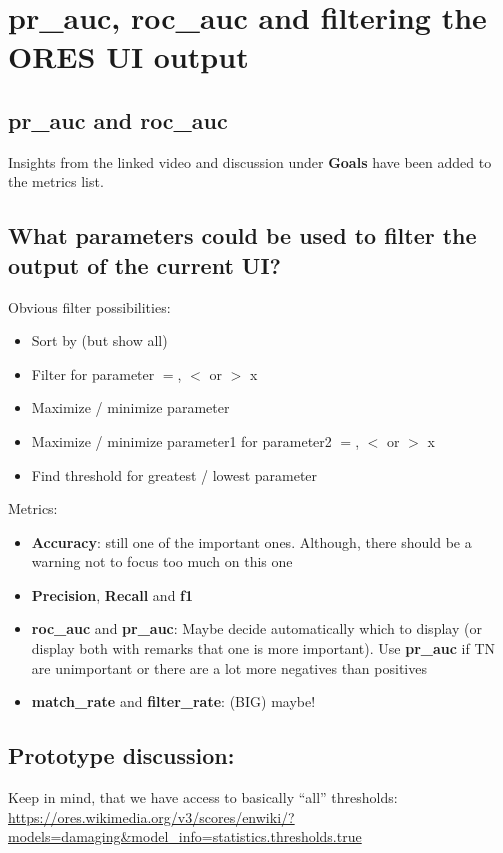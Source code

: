 \documentclass[12pt,a4paper]{article}
\begin{document}
\section{pr\_auc, roc\_auc and filtering the ORES UI output}
\subsection{pr\_auc and roc\_auc}
Insights from the linked video and discussion under \textbf{Goals} have been added to the metrics list.
\subsection{What parameters could be used to filter the output of the current UI?}
Obvious filter possibilities:
\begin{itemize}
\item Sort by (but show all)
\item Filter for parameter $=$, $<$ or $>$ x
\item Maximize / minimize parameter
\item Maximize / minimize parameter1 for parameter2 $=$, $<$ or $>$ x
\item Find threshold for greatest / lowest parameter
\end{itemize}
Metrics:
\begin{itemize}
\item \textbf{Accuracy}: still one of the important ones. Although, there should be a warning not to focus too much on this one
\item \textbf{Precision}, \textbf{Recall} and \textbf{f1}
\item \textbf{roc\_auc} and \textbf{pr\_auc}: Maybe decide automatically which to display (or display both with remarks that one is more important). Use \textbf{pr\_auc} if TN are unimportant or there are a lot more negatives than positives
\item \textbf{match\_rate} and \textbf{filter\_rate}: (BIG) maybe!
\end{itemize}
\subsection{Prototype discussion:}
Keep in mind, that we have access to basically ``all'' thresholds: \url{https://ores.wikimedia.org/v3/scores/enwiki/?models=damaging&model_info=statistics.thresholds.true}
%
%
%
%
%
\end{document}
